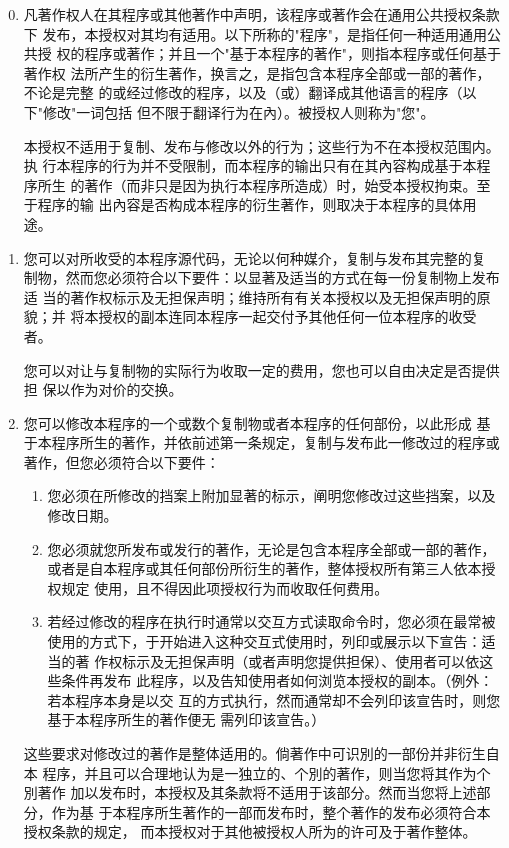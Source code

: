 \begin{enumerate}
\setcounter{enumi}{-1}
\item  %
凡著作权人在其程序或其他著作中声明，该程序或著作会在通用公共授权条款下
发布，本授权对其均有适用。以下所称的"程序"，是指任何一种适用通用公共授
权的程序或著作；并且一个"基于本程序的著作"，则指本程序或任何基于著作权
法所产生的衍生著作，换言之，是指包含本程序全部或一部的著作，不论是完整
的或经过修改的程序，以及（或）翻译成其他语言的程序（以下"修改"一词包括
但不限于翻译行为在內）。被授权人则称为"您"。

本授权不适用于复制、发布与修改以外的行为；这些行为不在本授权范围内。执
行本程序的行为并不受限制，而本程序的输出只有在其內容构成基于本程序所生
的著作（而非只是因为执行本程序所造成）时，始受本授权拘束。至于程序的输
出內容是否构成本程序的衍生著作，则取决于本程序的具体用途。
\item %
    您可以对所收受的本程序源代码，无论以何种媒介，复制与发布其完整的复
制物，然而您必须符合以下要件：以显著及适当的方式在每一份复制物上发布适
当的著作权标示及无担保声明；维持所有有关本授权以及无担保声明的原貌；并
将本授权的副本连同本程序一起交付予其他任何一位本程序的收受者。
    
您可以对让与复制物的实际行为收取一定的费用，您也可以自由决定是否提供担
保以作为对价的交换。
\item 您可以修改本程序的一个或数个复制物或者本程序的任何部份，以此形成
基于本程序所生的著作，并依前述第一条规定，复制与发布此一修改过的程序或
著作，但您必须符合以下要件：

\begin{enumerate}
\item 您必须在所修改的挡案上附加显著的标示，阐明您修改过这些挡案，以及修改日期。
\item 您必须就您所发布或发行的著作，无论是包含本程序全部或一部的著作，
或者是自本程序或其任何部份所衍生的著作，整体授权所有第三人依本授权规定
使用，且不得因此项授权行为而收取任何费用。
\item 若经过修改的程序在执行时通常以交互方式读取命令时，您必须在最常被
使用的方式下，于开始进入这种交互式使用时，列印或展示以下宣告：适当的著
作权标示及无担保声明（或者声明您提供担保）、使用者可以依这些条件再发布
此程序，以及告知使用者如何浏览本授权的副本。（例外：若本程序本身是以交
互的方式执行，然而通常却不会列印该宣告时，则您基于本程序所生的著作便无
需列印该宣告。）
\end{enumerate}
这些要求对修改过的著作是整体适用的。倘著作中可识別的一部份并非衍生自本
程序，并且可以合理地认为是一独立的、个別的著作，则当您将其作为个別著作
加以发布时，本授权及其条款将不适用于该部分。然而当您将上述部分，作为基
于本程序所生著作的一部而发布时，整个著作的发布必须符合本授权条款的规定，
而本授权对于其他被授权人所为的许可及于著作整体。


\end{enumerate}
